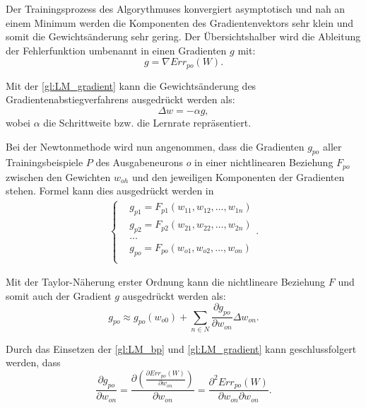 Der Trainingsprozess des Algorythmuses konvergiert asymptotisch und nah an einem Minimum werden die Komponenten des Gradientenvektors sehr klein und somit die Gewichtsänderung sehr gering. Der Übersichtshalber wird die Ableitung der Fehlerfunktion umbenannt in einen Gradienten $g$ mit:
\begin{equation}
g= \nabla Err_{po}(W).
\label{gl:LM_gradient}
\end{equation}

Mit der \autoref{gl:LM_gradient} kann die Gewichtsänderung des Gradientenabstiegverfahrens ausgedrückt werden als:
\begin{equation}
\Delta w= - \alpha g,
\label{gl:LM_bp_delta-w}
\end{equation}
wobei $\alpha$ die Schrittweite bzw. die Lernrate repräsentiert.

Bei der Newtonmethode wird nun angenommen, dass die Gradienten $g_{po}$ aller Trainingsbeispiele $P$ des Ausgabeneurons $o$ in einer nichtlinearen Beziehung $F_{po}$ zwischen den Gewichten $w_{oh}$ und den jeweiligen Komponenten der Gradienten stehen. Formel kann dies ausgedrückt werden in
\begin{align}
\left \{
\begin{aligned}
&g_{p1}= F_{p1}(w_{11},w_{12},\dots, w_{1n})\\ 
&g_{p2}= F_{p2}(w_{21},w_{22},\dots, w_{2n})\\
&\dots\\
&g_{po}= F_{po}(w_{o1},w_{o2},\dots, w_{on})\\
\end{aligned}
.
\right.
\label{gl:LM_g1}
\end{align}

Mit der Taylor-Näherung erster Ordnung kann die nichtlineare Beziehung $F$ und somit auch der Gradient $g$ ausgedrückt werden als:
\begin{equation}
g_{po} \approx g_{po}(w_{o0}) + \sum\limits_{n \in N} \frac{\partial g_{po}}{\partial w_{on}} \Delta w_{on}.
\label{gl:LM_g2}
\end{equation}

Durch das Einsetzen der \autoref{gl:LM_bp} und \autoref{gl:LM_gradient} kann geschlussfolgert werden, dass
\begin{equation}
\frac{\partial g_{po}}{\partial w_{on}} = \frac{\partial \left ( \frac{\partial Err_{po}(W)}{\partial w_{on}} \right )}{\partial w_{on}} = \frac{\partial^2  Err_{po}(W)}{\partial w_{on} \partial w_{on}}.
\label{gl:LM_g3}
\end{equation}

